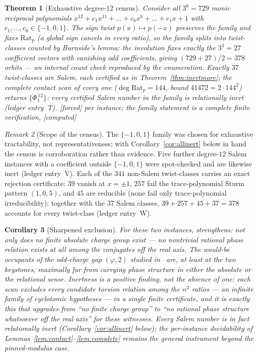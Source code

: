 \documentclass[11pt]{article}
\theoremstyle{plain}
\newtheorem{theorem}{Theorem}[section]
\newtheorem{corollary}[theorem]{Corollary}
\theoremstyle{definition}
\theoremstyle{remark}
\newtheorem{remark}[theorem]{Remark}
\newcommand{\Rat}{\mathrm{Rat}}
\newcommand{\F}{\textnormal{[forced]}}
\newcommand{\C}{\textnormal{[computed]}}
\begin{document}
\begin{theorem}[Exhaustive degree-$12$ census]\label{thm:census}
Consider all $3^6=729$ monic reciprocal polynomials
$x^{12}+c_1x^{11}+\dots+c_6x^6+\dots+c_1x+1$ with
$c_1,\dots,c_6\in\{-1,0,1\}$. The sign twist $p(x)\mapsto p(-x)$ preserves
the family and fixes $\Rat_p$ (a global sign cancels in every ratio), so the
family splits into twist-classes counted by Burnside's lemma: the involution
fixes exactly the $3^3=27$ coefficient vectors with vanishing odd
coefficients, giving $(729+27)/2=378$ orbits --- an internal count check
reproduced by the enumeration. Exactly $37$ twist-classes are
Salem, each certified as in Theorem~\ref{thm:inertmore}; the complete
contact scan of every one ($\deg\Rat_p=144$, bound $41472=2\cdot144^2$)
returns $\{\Phi_1^{\,12}\}$: \emph{every certified Salem number in the
family is relationally inert} (ledger entry~T). \F{} per instance; the
family statement is a complete finite verification, \C
\end{theorem}

\begin{remark}[Scope of the census]\label{rem:censusscope}
The $\{-1,0,1\}$ family was chosen for exhaustive tractability, not
representativeness; with Corollary~\ref{cor:allinert} below in hand the
census is corroboration rather than evidence. Five further degree-$12$
Salem instances with a coefficient outside $\{-1,0,1\}$ were spot-checked
and are likewise inert (ledger entry~V). Each of the $341$ non-Salem
twist-classes carries an exact rejection certificate: $39$ vanish at
$x=\pm1$, $257$ fail the trace-polynomial Sturm pattern $(1,0,5)$, and $45$
are reducible (none fail only trace-polynomial irreducibility); together
with the $37$ Salem classes, $39+257+45+37=378$ accounts for every
twist-class (ledger entry~W).
\end{remark}

\begin{corollary}[Sharpened exclusion]\label{cor:sharpexcl}
For these two instances, \cite[Lem.~6.1]{CMC} strengthens: not only does no
finite absolute charge group exist --- no nontrivial rational phase relation
exists at all among the conjugates off the real axis. The would-be occupants of
the odd-charge gap $(\varphi,2)$ studied in~\cite[Thm.~6.2]{CMC} are, at least
at the two keystones, maximally far from carrying phase structure in either the
absolute or the relational sense. Inertness is a positive finding, not the
absence of one: each scan excludes \emph{every} candidate torsion relation
among the $n^2$ ratios --- an infinite family of cyclotomic hypotheses --- in
a single finite certificate, and it is exactly this that upgrades
\cite[Lem.~6.1]{CMC} from ``no finite charge group'' to ``no rational phase
structure whatsoever off the real axis'' for these witnesses. Every Salem
number is in fact relationally inert (Corollary~\ref{cor:allinert} below);
the per-instance decidability of
Lemmas~\ref{lem:contact}--\ref{lem:complete} remains the general
instrument beyond the pinned-modulus case.
\end{corollary}
\end{document}
